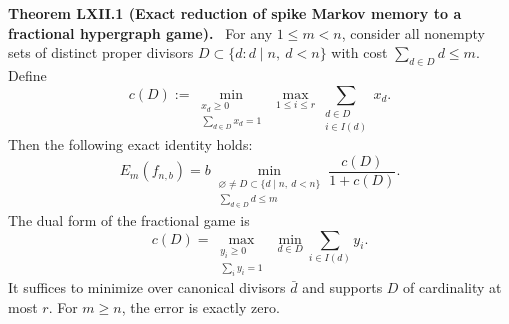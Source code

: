 \documentclass[11pt,a4paper,oneside]{book}
\newcommand{\statement}[3]{\par\medskip\noindent\textbf{#1 #2 (#3).}\ }
\begin{document}
\statement{Theorem}{LXII.1}{Exact reduction of spike Markov memory to a fractional hypergraph game}
For any $1\le m<n$, consider all nonempty sets of distinct proper divisors $D\subset\{d:d\mid n,\ d<n\}$ with cost $\sum_{d\in D}d\le m$. Define
\begin{equation}
c(D):=\min_{\substack{x_d\ge0\\\sum_{d\in D}x_d=1}}\ \max_{1\le i\le r}\sum_{\substack{d\in D\\i\in I(d)}}x_d.\tag{392}
\end{equation}
Then the following exact identity holds:
\begin{equation}
E_m(f_{n,b})=b\min_{\substack{\varnothing\ne D\subset\{d\mid n,\ d<n\}\\\sum_{d\in D}d\le m}}\frac{c(D)}{1+c(D)}.\tag{393}
\end{equation}
The dual form of the fractional game is
\begin{equation}
c(D)=\max_{\substack{y_i\ge0\\\sum_i y_i=1}}\ \min_{d\in D}\sum_{i\in I(d)}y_i.\tag{394}
\end{equation}
It suffices to minimize over canonical divisors $\bar d$ and supports $D$ of cardinality at most $r$. For $m\ge n$, the error is exactly zero.
\end{document}
